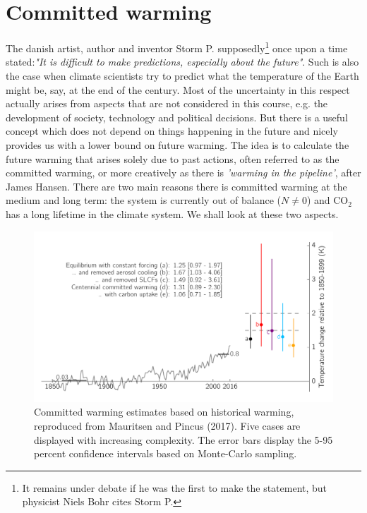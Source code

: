 \documentclass[12pt]{book}
\begin{document}
\section{Committed warming}
The danish artist, author and inventor Storm P. supposedly\footnote{It remains under debate if he was the first to make the statement, but physicist Niels Bohr cites Storm P. } once upon a time stated:{\em "It is difficult to make predictions, especially about the future"}. Such is also the case when climate scientists try to predict what the temperature of the Earth might be, say, at the end of the century. Most of the uncertainty in this respect actually arises from aspects that are not considered in this course, e.g. the development of society, technology and political decisions. But there is a useful concept which does not depend on things happening in the future and nicely provides us with a lower bound on future warming. The idea is to calculate the future warming that arises solely due to past actions, often referred to as the committed warming, or more creatively as there is {\em 'warming in the pipeline'}, after James Hansen. There are two main reasons there is committed warming at the medium and long term: the system is currently out of balance ($N\ne 0$) and CO$_2$ has a long lifetime in the climate system. We shall look at these two aspects.

\begin{figure}
	\begin{center}
		\includegraphics[width=\textwidth]{../external_figures/Committed_warming.pdf}
	\end{center}
	\caption{ Committed warming estimates based on historical warming, reproduced from Mauritsen and Pincus (2017). Five cases are displayed with increasing complexity. The error bars display the 5-95 percent confidence intervals based on Monte-Carlo sampling. } 
	\label{fig:committed_warming}
\end{figure}
\end{document}
